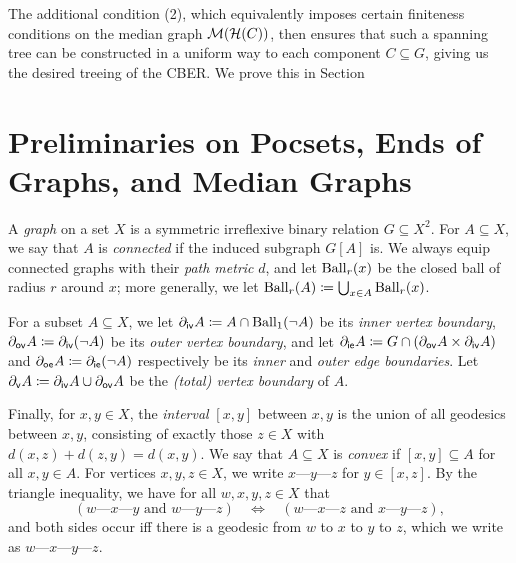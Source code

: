 \documentclass[reqno]{amsart}
\begin{document}
    The additional condition (2), which equivalently imposes certain finiteness conditions on the median graph $\mathcal{M}(\mathcal{H}(C))$, then ensures that such a spanning tree can be constructed in a uniform way to each component $C\subseteq G$, giving us the desired treeing of the CBER. We prove this in Section \TODO

    \section{Preliminaries on Pocsets, Ends of Graphs, and Median Graphs}\label{sec:preliminaries}
    \renewcommand{\-}{\textrm{---}}

    \begin{notation*}
        A \textit{graph} on a set $X$ is a symmetric irreflexive binary relation $G\subseteq X^2$. For $A\subseteq X$, we say that $A$ is \textit{connected} if the induced subgraph $G[A]$ is. We always equip connected graphs with their \textit{path metric} $d$, and let $\operatorname{Ball}_r(x)$ be the closed ball of radius $r$ around $x$; more generally, we let $\operatorname{Ball}_r(A)\coloneqq\bigcup_{x\in A}\operatorname{Ball}_r(x)$.

        For a subset $A\subseteq X$, we let $\partial_\mathsf{iv}A\coloneqq A\cap\operatorname{Ball}_1(\lnot A)$ be its \textit{inner vertex boundary}, $\partial_\mathsf{ov}A\coloneqq\partial_\mathsf{iv}(\lnot A)$ be its \textit{outer vertex boundary}, and let $\partial_\mathsf{ie}A\coloneqq G\cap(\partial_\mathsf{ov}A\times\partial_\mathsf{iv}A)$ and $\partial_\mathsf{oe}A\coloneqq\partial_\mathsf{ie}(\lnot A)$ respectively be its \textit{inner} and \textit{outer edge boundaries}. Let $\partial_\mathsf{v}A\coloneqq\partial_\mathsf{iv}A\cup\partial_\mathsf{ov}A$ be the \textit{(total) vertex boundary} of $A$.

        Finally, for $x,y\in X$, the \textit{interval} $[x,y]$ between $x,y$ is the union of all geodesics between $x,y$, consisting of exactly those $z\in X$ with $d(x,z)+d(z,y)=d(x,y)$. We say that $A\subseteq X$ is \textit{convex} if $[x,y]\subseteq A$ for all $x,y\in A$. For vertices $x,y,z\in X$, we write $x\-y\-z$ for $y\in[x,z]$. By the triangle inequality, we have for all $w,x,y,z\in X$ that
        \begin{equation*}
            (w\-x\-y\textrm{ and }w\-y\-z)\ \ \ \ \Leftrightarrow\ \ \ \ (w\-x\-z\textrm{ and }x\-y\-z),
        \end{equation*}
        and both sides occur iff there is a geodesic from $w$ to $x$ to $y$ to $z$, which we write as $w\-x\-y\-z$.
    \end{notation*}
\end{document}
